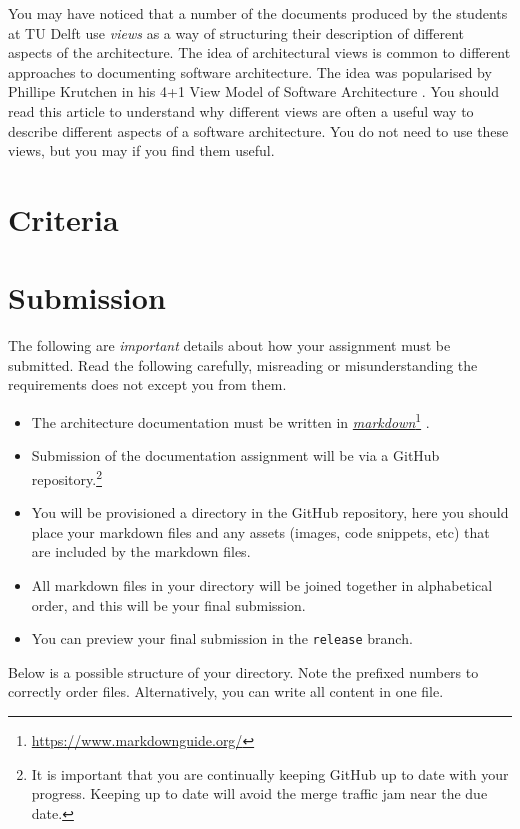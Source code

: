 \documentclass{csse4400}
\newcommand{\link}[2]{%
\href{#2}{#1}\footnote{\url{#2}}%
}
\begin{document}
You may have noticed that a number of the documents produced by the students at TU Delft use \textsl{views} 
as a way of structuring their description of different aspects of the architecture. The idea of architectural views
is common to different approaches to documenting software architecture. The idea was popularised by Phillipe 
Krutchen in his 4+1 View Model of Software Architecture \cite{4+1-model}.
You should read this article to understand why different views are often a useful way to describe different
aspects of a software architecture. You do not need to use these views, but you may if you find them useful.

\section{Criteria}

\section{Submission}
The following are \textsl{important} details about how your assignment must be submitted.
Read the following carefully, misreading or misunderstanding the requirements does not except you from them.

\begin{itemize}
    \item The architecture documentation must be written in \link{\textsl{markdown}}{https://www.markdownguide.org/}.
    \item Submission of the documentation assignment will be via a GitHub repository.\footnote{It is important that you are continually keeping GitHub up to date with your progress.
        Keeping up to date will avoid the merge traffic jam near the due date.}
    \item You will be provisioned a directory in the GitHub repository,
        here you should place your markdown files and any assets (images, code snippets, etc) that are included by the markdown files.
    \item All markdown files in your directory will be joined together in alphabetical order,
        and this will be your final submission.
    \item You can preview your final submission in the \texttt{release} branch.
\end{itemize}

Below is a possible structure of your directory. Note the prefixed numbers to correctly order files.
Alternatively, you can write all content in one file.
\end{document}

